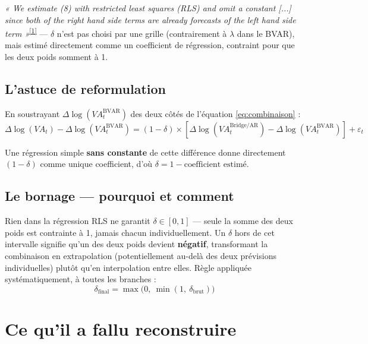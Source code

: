 \documentclass[11pt,a4paper]{article}
\newcommand{\cit}[1]{\textsuperscript{\hyperlink{ref#1}{[#1]}}}
\begin{document}
\begin{definitionbox}
\textit{« We estimate (8) with restricted least squares (RLS) and omit a constant [...] since both of the right hand side terms are already forecasts of the left hand side term »}\cit{1} --- $\delta$ n'est pas choisi par une grille (contrairement à $\lambda$ dans le BVAR), mais estimé directement comme un coefficient de régression, contraint pour que les deux poids somment à 1.
\end{definitionbox}

\subsection{L'astuce de reformulation}

En soustrayant $\Delta\log(VA_t^{\text{BVAR}})$ des deux côtés de l'équation \ref{eq:combinaison} :
\begin{equation}
\Delta\log(VA_t) - \Delta\log(VA_t^{\text{BVAR}}) = (1-\delta)\times\left[\Delta\log(VA_t^{\text{Bridge/AR}}) - \Delta\log(VA_t^{\text{BVAR}})\right] + \varepsilon_t
\label{eq:rls_reformule}
\end{equation}

Une régression simple \textbf{sans constante} de cette différence donne directement $(1-\delta)$ comme unique coefficient, d'où $\delta = 1 - \text{coefficient estimé}$.

\subsection{Le bornage --- pourquoi et comment}

\begin{definitionbox}
Rien dans la régression RLS ne garantit $\delta\in[0,1]$ --- seule la somme des deux poids est contrainte à 1, jamais chacun individuellement. Un $\delta$ hors de cet intervalle signifie qu'un des deux poids devient \textbf{négatif}, transformant la combinaison en extrapolation (potentiellement au-delà des deux prévisions individuelles) plutôt qu'en interpolation entre elles. Règle appliquée systématiquement, à toutes les branches :
\begin{equation}
\delta_{\text{final}} = \max\big(0,\ \min(1,\ \delta_{\text{brut}})\big)
\label{eq:bornage}
\end{equation}
\end{definitionbox}

\section{Ce qu'il a fallu reconstruire}
\end{document}
